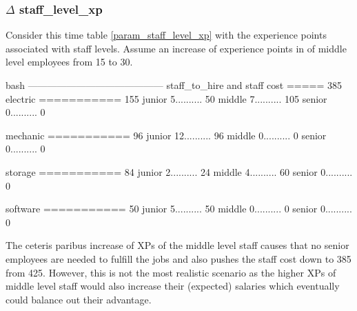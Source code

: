     \subsubsection{$\Delta$ staff\_level\_xp}
    Consider this time table \ref{param_staff_level_xp} with the experience points associated with
    staff levels. Assume an increase of experience points in of middle level employees from 15 to 30.
    \bigskip
    \newline
        \vspace{2pt}
        \begin{boxminted}{bash}
            ------------------------------------------
            staff_to_hire and staff cost ===== 385
            electric   =========== 155
            junior     5.......... 50
            middle     7.......... 105
            senior     0.......... 0
            
            mechanic   =========== 96
            junior     12.......... 96
            middle     0.......... 0
            senior     0.......... 0
            
            storage   =========== 84
            junior     2.......... 24
            middle     4.......... 60
            senior     0.......... 0
            
            software   =========== 50
            junior     5.......... 50
            middle     0.......... 0
            senior     0.......... 0            
        \end{boxminted}
    \newline
    The ceteris paribus increase of XPs of the middle level staff causes that no senior employees are
    needed to fulfill the jobs and also pushes the staff cost down to 385 from 425. However, this is
    not the most realistic scenario as the higher XPs of middle level staff would also increase 
    their (expected) salaries which eventually could balance out their advantage.
